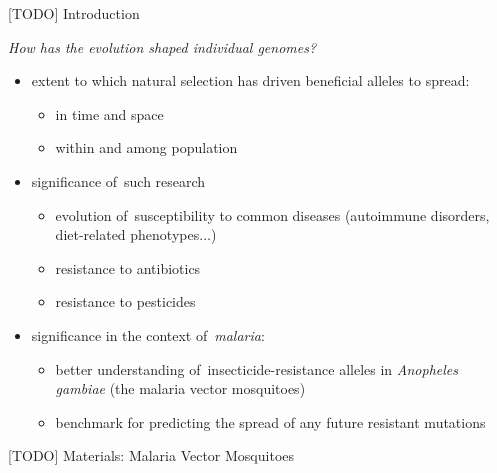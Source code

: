 \documentclass[final,hyperref={pdfpagelabels=false}]{beamer}
\begin{document}
\begin{frame}[t]
\begin{columns}[t]
\begin{column}{.465\textwidth}
            
\begin{block}{[TODO] Introduction}

\emph{How has the evolution shaped individual genomes?}

\begin{itemize}
\item extent to which natural selection has driven beneficial alleles to spread:
    \begin{itemize}
    \item in time and space
    \item within and among population
    \end{itemize}
\end{itemize}

\begin{itemize}
    \item significance of~such research
    \begin{itemize}
    	\item evolution of~susceptibility to common diseases (autoimmune disorders, diet-related phenotypes$\dots$)
    	\item resistance to antibiotics
    	\item resistance to pesticides
    \end{itemize}
\end{itemize}

\begin{itemize}
\item significance in the context of~\emph{malaria}:
    \begin{itemize}
	\item better understanding  of~insecticide-resistance alleles in \emph{Anopheles gambiae} (the malaria vector mosquitoes)
	\item benchmark for predicting the spread of any future resistant mutations
    \end{itemize}
\end{itemize}
\end{block}


\begin{block}{[TODO] Materials: Malaria Vector Mosquitoes}


\end{block}
\end{column}
\end{columns}
\end{frame}
\end{document}
